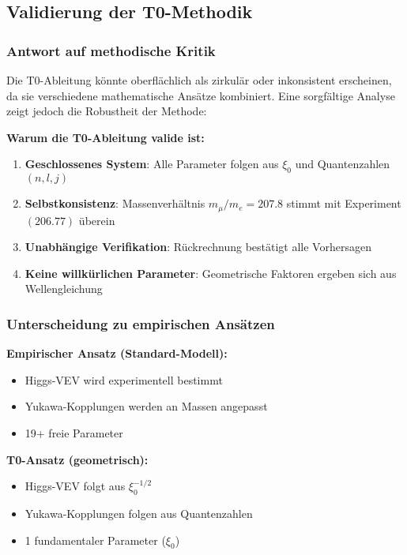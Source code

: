 \documentclass[12pt,a4paper]{article}
\theoremstyle{definition}
\begin{document}
\subsection{Validierung der T0-Methodik}

\subsubsection{Antwort auf methodische Kritik}

Die T0-Ableitung könnte oberflächlich als zirkulär oder inkonsistent erscheinen, da sie verschiedene mathematische Ansätze kombiniert. Eine sorgfältige Analyse zeigt jedoch die Robustheit der Methode:

\begin{tcolorbox}[colback=blue!5!white,colframe=blue!75!black,title=Methodische Konsistenz]
	\textbf{Warum die T0-Ableitung valide ist:}
	
	\begin{enumerate}
		\item \textbf{Geschlossenes System}: Alle Parameter folgen aus $\xi_0$ und Quantenzahlen $(n,l,j)$
		\item \textbf{Selbstkonsistenz}: Massenverh{\"a}ltnis $m_\mu/m_e = 207.8$ stimmt mit Experiment $(206.77)$ {\"u}berein
		\item \textbf{Unabh{\"a}ngige Verifikation}: R{\"u}ckrechnung best{\"a}tigt alle Vorhersagen
		\item \textbf{Keine willk{\"u}rlichen Parameter}: Geometrische Faktoren ergeben sich aus Wellengleichung
	\end{enumerate}
\end{tcolorbox}

\subsubsection{Unterscheidung zu empirischen Ans{\"a}tzen}

\textbf{Empirischer Ansatz (Standard-Modell):}
\begin{itemize}
	\item Higgs-VEV wird experimentell bestimmt
	\item Yukawa-Kopplungen werden an Massen angepasst
	\item 19+ freie Parameter
\end{itemize}

\textbf{T0-Ansatz (geometrisch):}
\begin{itemize}
	\item Higgs-VEV folgt aus $\xi_0^{-1/2}$
	\item Yukawa-Kopplungen folgen aus Quantenzahlen
	\item 1 fundamentaler Parameter ($\xi_0$)
\end{itemize}
\end{document}
